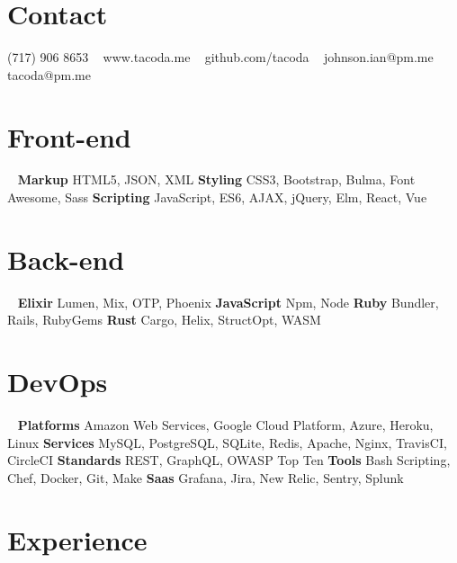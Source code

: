 \documentclass[]{cv-style}          %
\begin{document}


\begin{aside}
%
\section{Contact}
(717) 906 8653
~
www.tacoda.me
~
github.com/tacoda
~
johnson.ian@pm.me
tacoda@pm.me
%
\section{Front-end}
~
\textbf{Markup}
HTML5, JSON, XML
\textbf{Styling}
CSS3, Bootstrap, Bulma, Font Awesome, Sass
\textbf{Scripting}
JavaScript, ES6, AJAX, jQuery, Elm, React, Vue
\section{Back-end}
~
\textbf{Elixir}
Lumen, Mix, OTP, Phoenix
\textbf{JavaScript}
Npm, Node
\textbf{Ruby}
Bundler, Rails, RubyGems
\textbf{Rust}
Cargo, Helix, StructOpt, WASM
\section{DevOps}
~
\textbf{Platforms}
Amazon Web Services, Google Cloud Platform, Azure, Heroku, Linux
\textbf{Services}
MySQL, PostgreSQL, SQLite, Redis, Apache, Nginx, TravisCI, CircleCI
\textbf{Standards}
REST, GraphQL, OWASP Top Ten
\textbf{Tools}
Bash Scripting, Chef, Docker, Git, Make
\textbf{Saas}
Grafana, Jira, New Relic, Sentry, Splunk
\end{aside}


\section{Experience}
\end{document}
